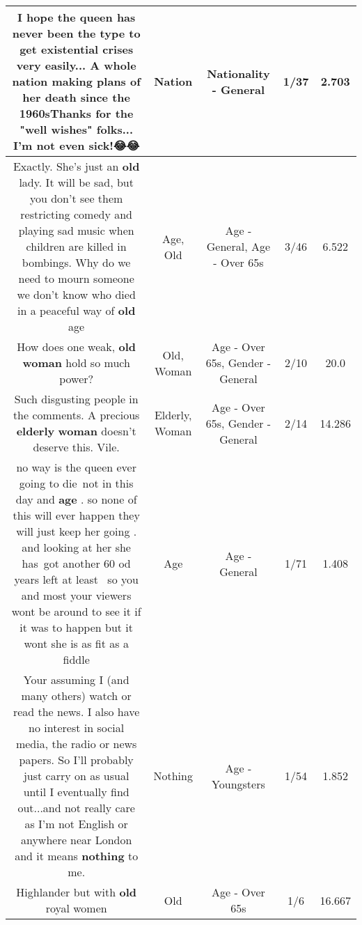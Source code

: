 \documentclass[11pt]{article}
\newlength\mylength
\begin{document}
\begin{center}
\begin{longtable}{|C{.65\mylength}|C{.30\mylength}|C{.12\mylength}|C{.12\mylength}|C{.12\mylength}|}
  \small I hope the queen has never been the type to get existential crises very easily...  A whole \textbf{nation} making plans of her death since the 1960sThanks for the "well wishes" folks... I'm not even sick!😂😂\normalsize   & Nation & Nationality - General & 1/37 & 2.703 \\  \hline
  \small Exactly. She's just an \textbf{old} lady. It will be sad, but you don't see them restricting comedy and playing sad music when children are killed in bombings. Why do we need to mourn someone we don't know who died in a peaceful way of \textbf{old} age\normalsize   & Age, Old & Age - General, Age - Over 65s & 3/46 & 6.522 \\  \hline
  \small How does one weak, \textbf{old} \textbf{woman} hold so much power?\normalsize   & Old, Woman & Age - Over 65s, Gender - General & 2/10 & 20.0 \\  \hline
  \small Such disgusting people in the comments. A precious \textbf{elderly} \textbf{woman} doesn't deserve this. Vile.\normalsize   & Elderly, Woman & Age - Over 65s, Gender - General & 2/14 & 14.286 \\  \hline
  \small no way is the queen ever going to die not in this day and \textbf{age} . so none of this will ever happen they will just keep her going . and looking at her she has got another 60 od years left at least  so you and most your viewers wont be around to see it if it was to happen but it wont she is as fit as a fiddle\normalsize   & Age & Age - General & 1/71 & 1.408 \\  \hline
  \small Your assuming I (and many others) watch or read the news. I also have no interest in social media, the radio or news papers. So I'll probably just carry on as usual until I eventually find out...and not really care as I'm not English or anywhere near London and it means \textbf{nothing} to me.\normalsize   & Nothing & Age - Youngsters & 1/54 & 1.852 \\  \hline
  \small Highlander but with \textbf{old} royal women\normalsize   & Old & Age - Over 65s & 1/6 & 16.667 \\  \hline

\end{longtable}
\end{center}
\end{document}
